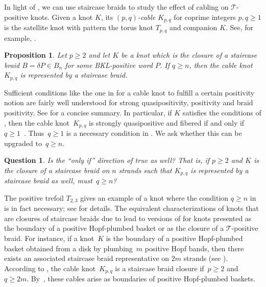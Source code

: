 \documentclass{amsart}
\theoremstyle{definition}
\theoremstyle{remark}
\newtheorem{remark}[definition]{Remark}%
\theoremstyle{plain}
\newtheorem{proposition}[definition]{Proposition}
\newtheorem{question}[definition]{Question}%
\newcommand{\T}{\mathcal{T}}
\begin{document}

In light of , %
we can use staircase braids to study the effect of cabling on $\T$-positive knots. Given a knot $K$, its \emph{$(p, q)$-cable $K_{p,q}$} for coprime integers $p,q \geq 1$ is the satellite knot with pattern the torus knot $T_{p,q}$ and companion $K$. See, for example, \cite[Section 4D]{rolfsen_2003}. 

\begin{proposition}\label{prop:cables}
Let $p \geq 2$ and let $K$ be a knot which is the closure of a staircase braid $B = \delta P\in B_n$ for some BKL-positive word $P$. If $q \geq n$, then the cable knot~$K_{p,q}$ is represented by a staircase braid.
\end{proposition}

Sufficient conditions like the one in  for a cable knot to fulfill a certain positivity notion are fairly well understood for strong quasipositivity, positivity and braid positivity. See \cite[Theorem~5.1]{kmms} for a concise summary. In particular, if $K$ satisfies the conditions of , then the cable knot~$K_{p,q}$ is strongly quasipositive and fibered if and only if $q \geq 1$~\cite{hedden:cabling}. Thus~$q \geq 1$ is a necessary condition in . We ask whether %
this can be upgraded to~$q \geq n$. 

\begin{question}
Is the ``only if'' direction of  true as well? That is, if $p \geq 2$ and $K$ is the closure of a staircase braid on $n$ strands such that $K_{p,q}$ is represented by a staircase braid as well, must~$q \geq n$?
\end{question}

The positive trefoil $T_{2,3}$ gives an example of a knot where the condition $q \geq n$ in  is in fact necessary; see  for details. 
%
The equivalent characterizations of knots that are closures of staircase braids due to \cite{Rudolph_Hopf_plumbing,banfield} lead to versions of  for knots presented as the boundary of a positive Hopf-plumbed basket or as the closure of a $\T$-positive braid. For instance, if a knot~$K$ is the boundary of a positive Hopf-plumbed basket obtained from a disk by plumbing~$m$ positive Hopf bands, then there exists an associated staircase braid representative on $2m$ strands (see \cite[Proof of Lemma~5.7]{banfield}). According to , the cable knot~$K_{p,q}$ is a staircase braid closure if~$p \geq 2$ and~$q \geq 2m$. By~\cite{Rudolph_Hopf_plumbing}, these cables arise as boundaries of positive Hopf-plumbed baskets. %
\end{document}
